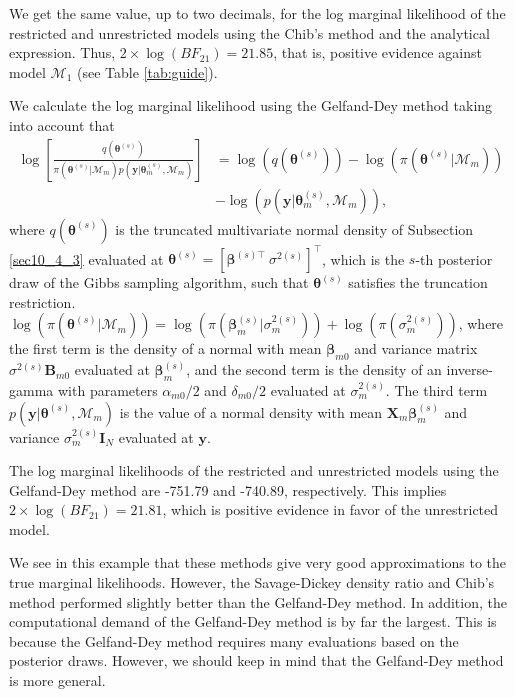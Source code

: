 We get the same value, up to two decimals, for the log marginal likelihood of the restricted and unrestricted models using the Chib's method and the analytical expression. Thus, $2\times\log(BF_{21})=21.85$, that is, positive evidence against model $\mathcal{M}_1$ (see Table \ref{tab:guide}).

We calculate the log marginal likelihood using the Gelfand-Dey method taking into account that
\begin{align*}
	\log\left[\frac{q(\bm{\theta}^{(s)})}{\pi(\bm{\theta}^{(s)}|\mathcal{M}_m)p(\bm{y}|\bm{\theta}^{(s)}_m,\mathcal{M}_m)}\right]&=\log(q(\bm{\theta}^{(s)}))-\log(\pi(\bm{\theta}^{(s)}|\mathcal{M}_m))\\
	&-\log(p(\bm{y}|\bm{\theta}^{(s)}_m,\mathcal{M}_m)),
\end{align*}
where $q(\bm{\theta}^{(s)})$ is the truncated multivariate normal density of Subsection \ref{sec10_4_3} evaluated at $\bm{\theta}^{(s)}=[\bm{\beta}^{(s)\top} \ \sigma^{2(s)}]^{\top}$, which is the $s$-th posterior draw of the Gibbs sampling algorithm, such that $\bm{\theta}^{(s)}$ satisfies the truncation restriction. $\log(\pi(\bm{\theta}^{(s)}|\mathcal{M}_m))=\log(\pi(\bm{\beta}_m^{(s)}|\sigma^{2(s)}_m))+\log(\pi(\sigma^{2(s)}_m))$, where the first term is the density of a normal with mean $\bm{\beta}_{m0}$ and variance matrix $\sigma^{2(s)}\bm{B}_{m0}$ evaluated at $\bm{\beta}_m^{(s)}$, and the second term is the density of an inverse-gamma with parameters $\alpha_{m0}/2$ and $\delta_{m0}/2$ evaluated at $\sigma^{2(s)}_m$. The third term $p(\bm{y}|\bm{\theta}^{(s)},\mathcal{M}_m)$ is the value of a normal density with mean $\bm{X}_m\bm{\beta}_{m}^{(s)}$ and variance $\sigma^{2(s)}_m\bm{I}_N$ evaluated at $\bm{y}$.

The log marginal likelihoods of the restricted and unrestricted models using the Gelfand-Dey method are -751.79 and -740.89, respectively. This implies $2\times \log(BF_{21})=21.81$, which is positive evidence in favor of the unrestricted model.

We see in this example that these methods give very good approximations to the true marginal likelihoods. However, the Savage-Dickey density ratio and Chib's method performed slightly better than the Gelfand-Dey method. In addition, the computational demand of the Gelfand-Dey method is by far the largest. This is because the Gelfand-Dey method requires many evaluations based on the posterior draws. However, we should keep in mind that the Gelfand-Dey method is more general.

